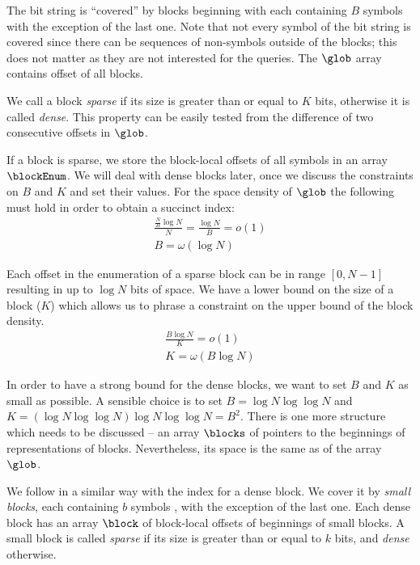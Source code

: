 The bit string is ``covered'' by blocks beginning with \ph{} each containing $B$ symbols \ph{} with the exception of the last one.
Note that not every symbol of the bit string is covered since there can be sequences of non-\ph symbols outside of the blocks; this does not matter as they are not interested for the queries.
The $\glob$ array contains offset of all blocks.

We call a block \emph{sparse} if its size is greater than or equal to $K$ bits, otherwise it is called \emph{dense}.
This property can be easily tested from the difference of two consecutive offsets in $\glob$.

If a block is sparse, we store the block-local offsets of all symbols \ph{} in an array $\blockEnum$.
We will deal with dense blocks later, once we discuss the constraints on $B$ and $K$ and set their values.
For the space density of $\glob$ the following must hold in order to obtain a succinct index:
\begin{gather*}
\frac{\frac{N}{B} \log N}{N} = \frac{\log N}{B} = o(1) \\
B = \omega(\log N)
\end{gather*}

Each offset in the enumeration of a sparse block can be in range $[0, N - 1]$ resulting in up to $\log N$ bits of space.
We have a lower bound on the size of a block ($K$) which allows us to phrase a constraint on the upper bound of the block density.
\begin{gather*}
\frac{B \log N}{K} = o(1) \\
K = \omega(B \log N)
\end{gather*}

In order to have a strong bound for the dense blocks, we want to set $B$ and $K$ as small as possible.
A sensible choice is to set $B = \log N \log \log N$ and $K = (\log N \log \log N) \log N \log \log N = B^2 $.
There is one more structure which needs to be discussed -- an array $\blocks$ of pointers to the beginnings of representations of blocks.
Nevertheless, its space is the same as of the array $\glob$.

\bigbreak

We follow in a similar way with the index for a dense block.
We cover it by \emph{small blocks}, each containing $b$ symbols \ph{}, with the exception of the last one.
Each dense block has an array $\block$ of block-local offsets of beginnings of small blocks.
A small block is called \emph{sparse} if its size is greater than or equal to $k$ bits, and \emph{dense} otherwise.

